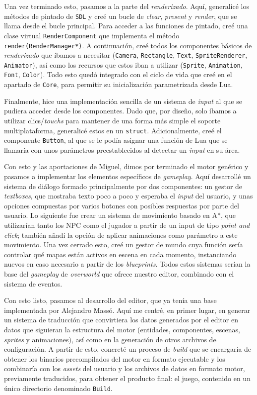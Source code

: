 Una vez terminado esto, pasamos a la parte del \textit{renderizado}. Aquí, generalicé los métodos de pintado de \texttt{SDL} y creé un bucle de \textit{clear}, \textit{present} y \textit{render}, que se llama desde el bucle principal. Para acceder a las funciones de pintado, creé una clase virtual \texttt{RenderComponent} que implementa el método \texttt{render(RenderManager*)}. A continuación, creé todos los componentes básicos de \textit{renderizado} que íbamos a necesitar (\texttt{Camera}, \texttt{Rectangle}, \texttt{Text}, \texttt{SpriteRenderer}, \texttt{Animator}), así como los recursos que estos iban a utilizar (\texttt{Sprite}, \texttt{Animation}, \texttt{Font}, \texttt{Color}). Todo esto quedó integrado con el ciclo de vida que creé en el apartado de \texttt{Core}, para permitir su inicialización parametrizada desde Lua. 

Finalmente, hice una implementación sencilla de un sistema de \textit{input} al que se pudiera acceder desde los componentes. Dado que, por diseño, solo íbamos a utilizar clics/\textit{touchs} para mantener de una forma más simple el soporte multiplataforma, generalicé estos en un \texttt{struct}. Adicionalmente, creé el componente \texttt{Button}, al que se le podía asignar una función de Lua que se llamaría con unos parámetros preestablecidos al detectar un \textit{input} en su área. 

Con esto y las aportaciones de Miguel, dimos por terminado el motor genérico y pasamos a implementar los elementos específicos de \textit{gameplay}. Aquí desarrollé un sistema de diálogo formado principalmente por dos componentes: un gestor de \textit{textboxes}, que mostraba texto poco a poco y esperaba el \textit{input} del usuario, y unas opciones compuestas por varios botones con posibles respuestas por parte del usuario. Lo siguiente fue crear un sistema de movimiento basado en A*, que utilizarían tanto los NPC como el jugador a partir de un input de tipo \textit{point and click}; también añadí la opción de aplicar animaciones como parámetro a este movimiento. Una vez cerrado esto, creé un gestor de mundo cuya función sería controlar qué mapas están activos en escena en cada momento, instanciando nuevos en caso necesario a partir de los \textit{blueprints}. Todos estos sistemas serían la base del \textit{gameplay} de \textit{overworld} que ofrece nuestro editor, combinado con el sistema de eventos. 

Con esto listo, pasamos al desarrollo del editor, que ya tenía una base implementada por Alejandro Massó. Aquí me centré, en primer lugar, en generar un sistema de traducción que convirtiera los datos generados por el editor en datos que siguieran la estructura del motor (entidades, componentes, escenas, \textit{sprites} y animaciones), así como en la generación de otros archivos de configuración. A partir de esto, concreté un proceso de \textit{build} que se encargaría de obtener los binarios precompilados del motor en formato ejecutable y los combinaría con los \textit{assets} del usuario y los archivos de datos en formato motor, previamente traducidos, para obtener el producto final: el juego, contenido en un único directorio denominado \texttt{Build}.  

